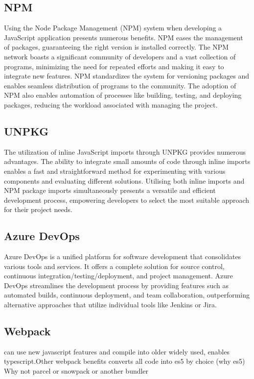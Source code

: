\documentclass{l4proj}
\begin{document}
\subsection{NPM}
\text Using the Node Package Management (NPM) system when developing a JavaScript application presents numerous benefits. NPM eases the management of packages, guaranteeing the right version is installed correctly. The NPM network boasts a significant community of developers and a vast collection of programs, minimizing the need for repeated efforts and making it easy to integrate new features. NPM standardizes the system for versioning packages and enables seamless distribution of programs to the community. The adoption of NPM also enables automation of processes like building, testing, and deploying packages, reducing the workload associated with managing the project.


\subsection{UNPKG}
\text The utilization of inline JavaScript imports through UNPKG provides numerous advantages. The ability to integrate small amounts of code through inline imports enables a fast and straightforward method for experimenting with various components and evaluating different solutions. Utilising both inline imports and NPM package imports simultaneously presents a versatile and efficient development process, empowering developers to select the most suitable approach for their project needs.

\subsection{Azure DevOps}
\text Azure DevOps is a unified platform for software development that consolidates various tools and services. It offers a complete solution for source control, continuous integration/testing/deployment, and project management. Azure DevOps streamlines the development process by providing features such as automated builds, continuous deployment, and team collaboration, outperforming alternative approaches that utilize individual tools like Jenkins or Jira.

\subsection{Webpack}
\text can use new javascript features and compile into older widely used, enables typescript.Other webpack benefits converts all code into es5 by choice (why es5)
Why not parcel or snowpack or another bundler
\end{document}
